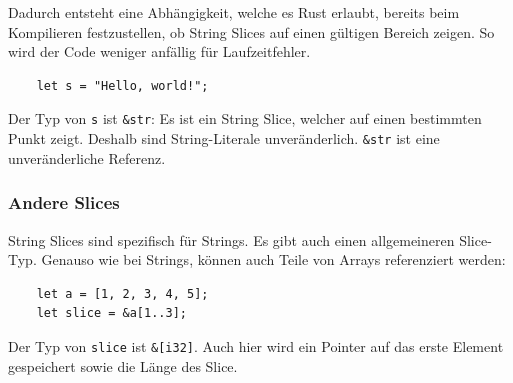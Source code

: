 Dadurch entsteht eine Abhängigkeit, welche es Rust erlaubt, bereits beim Kompilieren festzustellen, ob String Slices auf einen gültigen Bereich zeigen. So wird der Code weniger anfällig für Laufzeitfehler.

\begin{lstlisting}
    let s = "Hello, world!";
\end{lstlisting}

Der Typ von \verb"s" ist \verb"&str": Es ist ein String Slice, welcher auf einen bestimmten Punkt zeigt. Deshalb sind String-Literale unveränderlich. \verb"&str" ist eine unveränderliche Referenz.

\subsubsection{Andere Slices}

String Slices sind spezifisch für Strings. Es gibt auch einen allgemeineren Slice-Typ. Genauso wie bei Strings, können auch Teile von Arrays referenziert werden:

\begin{lstlisting}
    let a = [1, 2, 3, 4, 5];
    let slice = &a[1..3];
\end{lstlisting}

Der Typ von \verb"slice" ist \verb"&[i32]". Auch hier wird ein Pointer auf das erste Element gespeichert sowie die Länge des Slice.

